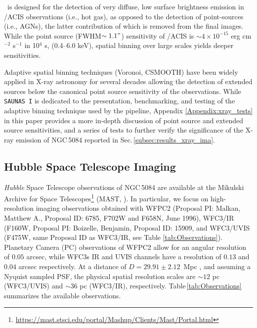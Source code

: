 \documentclass[modern]{aastex631}
\begin{document}
\SAUNAS\ is designed for the detection of very diffuse, low surface brightness emission in \Chandra/ACIS observations (i.e., hot gas), as opposed to the detection of point-sources (i.e., AGNs), the latter contribution of which is removed from the final images. While the point source (FWHM$\sim1.1"$) sensitivity of \Chandra/ACIS is $\sim4\times10^{-15}$ erg cm$^{-2}$ s$^{-1}$ in 10$^4$ s, (0.4--6.0 keV), spatial binning over large scales yields deeper sensitivities.

Adaptive spatial binning techniques (Voronoi, CSMOOTH) \citep{cappellari+2003mnras342_345, ebeling+2006mnras368_65} have been widely applied in X-ray astronomy for several decades \citep[see][and references therein]{ebeling+2007apj661_33,gonzalezmartin+2009aap506_1107,broos+2010apj714_1582, ebeling+2010mnras407_83, xue+2011apj195_10, hodgeskluck+2012apj746_167, wang+2024apj962_188} allowing the detection of extended sources below the canonical point source sensitivity of the observations. While \texttt{SAUNAS I} \citep{borlaff+2024apj967_169} is dedicated to the presentation, benchmarking, and testing of the adaptive binning technique used by the pipeline, Appendix \ref{Appendix:xray_tests} in this paper provides a more in-depth discussion of point source and extended source sensitivities, and a series of tests to further verify the significance of the X-ray emission of NGC\,5084 reported in Sec.\,\ref{subsec:results_xray_ima}.

\subsection{Hubble Space Telescope Imaging}
\label{sec:data_hst}

\emph{Hubble} Space Telescope observations of NGC\,5084 are available at the Mikulski Archive for Space Telescopes\footnote{\url{https://mast.stsci.edu/portal/Mashup/Clients/Mast/Portal.html}} (MAST, ). In particular, we focus on high-resolution imaging observations obtained with WFPC2 (Proposal PI: Malkan, Matthew A.,
Proposal ID: 6785, F702W and F658N, June 1996), WFC3/IR (F160W, Proposal PI: Boizelle, Benjamin, Proposal ID: 15909, and WFC3/UVIS (F475W, same Proposal ID as WFC3/IR, see Table \ref{tab:Observations}). Planetary Camera (PC) observations of WFPC2 allow for an angular resolution of $0.05$ arcsec, while WFC3s IR and UVIS channels have a resolution of $0.13$ and $0.04$ arcsec respectively. At a distance of $D=	29.91\pm2.12$~Mpc \citep[6.90~arcsec~kpc$^{-1}$,][]{koribalski+2004aj128_16}, and assuming a Nyquist sampled PSF, the physical spatial resolution scales are $\sim12$ pc (WFC3/UVIS) and $\sim36$ pc (WFC3/IR), respectively. Table\,\ref{tab:Observations} summarizes the available observations.
\end{document}
